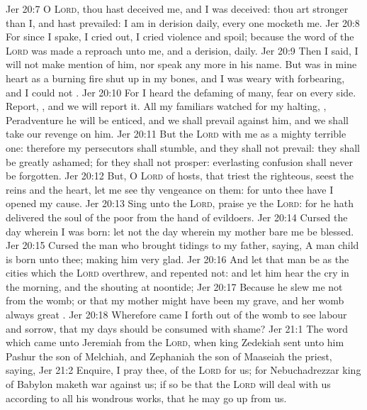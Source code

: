 \vs Jer 20:7 O \textsc{Lord}, thou hast deceived me, and I was deceived: thou art stronger than I, and hast prevailed: I am in derision daily, every one mocketh me.
\vs Jer 20:8 For since I spake, I cried out, I cried violence and spoil; because the word of the \textsc{Lord} was made a reproach unto me, and a derision, daily.
\vs Jer 20:9 Then I said, I will not make mention of him, nor speak any more in his name. But  was in mine heart as a burning fire shut up in my bones, and I was weary with forbearing, and I could not .
\vs Jer 20:10 For I heard the defaming of many, fear on every side. Report, , and we will report it. All my familiars watched for my halting, , Peradventure he will be enticed, and we shall prevail against him, and we shall take our revenge on him.
\vs Jer 20:11 But the \textsc{Lord}  with me as a mighty terrible one: therefore my persecutors shall stumble, and they shall not prevail: they shall be greatly ashamed; for they shall not prosper:  everlasting confusion shall never be forgotten.
\vs Jer 20:12 But, O \textsc{Lord} of hosts, that triest the righteous,  seest the reins and the heart, let me see thy vengeance on them: for unto thee have I opened my cause.
\vs Jer 20:13 Sing unto the \textsc{Lord}, praise ye the \textsc{Lord}: for he hath delivered the soul of the poor from the hand of evildoers.
\vs Jer 20:14 Cursed  the day wherein I was born: let not the day wherein my mother bare me be blessed.
\vs Jer 20:15 Cursed  the man who brought tidings to my father, saying, A man child is born unto thee; making him very glad.
\vs Jer 20:16 And let that man be as the cities which the \textsc{Lord} overthrew, and repented not: and let him hear the cry in the morning, and the shouting at noontide;
\vs Jer 20:17 Because he slew me not from the womb; or that my mother might have been my grave, and her womb  always great .
\vs Jer 20:18 Wherefore came I forth out of the womb to see labour and sorrow, that my days should be consumed with shame?
\vs Jer 21:1 The word which came unto Jeremiah from the \textsc{Lord}, when king Zedekiah sent unto him Pashur the son of Melchiah, and Zephaniah the son of Maaseiah the priest, saying,
\vs Jer 21:2 Enquire, I pray thee, of the \textsc{Lord} for us; for Nebuchadrezzar king of Babylon maketh war against us; if so be that the \textsc{Lord} will deal with us according to all his wondrous works, that he may go up from us.
